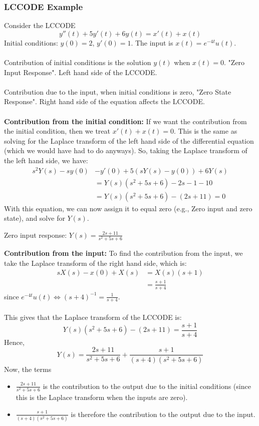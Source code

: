 \documentclass[10pt]{article}
\newcommand{\llra}{\Longleftrightarrow}
\begin{document}
\subsubsection*{LCCODE Example}
Consider the LCCODE
\[y''(t) + 5y'(t) + 6y(t) = x'(t) + x(t)\]
Initial conditions: $y(0) = 2$, $y'(0) = 1$.  The input is $x(t) = e^{-4t} u(t)$.\\\\
Contribution of initial conditions is the solution $y(t)$ when $x(t) = 0$.  "Zero Input Response".  Left hand side of the LCCODE.\\\\
Contribution due to the input, when initial conditions is zero, "Zero State Response".  Right hand side of the equation affects the LCCODE.\\\\
\textbf{Contribution from the initial condition:} If we want the contribution from the initial condition, then we treat $x'(t) + x(t) = 0$.  This is the same as solving for the Laplace transform of the left hand side of the differential equation (which we would have had to do anyways).  So, taking the Laplace transform of the left hand side, we have:
\begin{align*}
    s^2 Y(s) - sy(0) &- y'(0) + 5(sY(s) - y(0)) + 6Y(s)\\
    &= Y(s)(s^2 + 5s + 6) - 2s - 1 - 10\\
    &= Y(s)(s^2 + 5s + 6) - (2s + 11) = 0
\end{align*}
With this equation, we can now assign it to equal zero (e.g., Zero input and zero state), and solve for $Y(s)$.
\begin{center}
Zero input response: $Y(s) = \frac{2s + 11}{s^2 + 5s + 6}$
\end{center}
\textbf{Contribution from the input:} To find the contribution from the input, we take the Laplace transform of the right hand side, which is:
\begin{align*}
    sX(s) - x(0) + X(s) &= X(s)(s + 1)\\
    &= \frac{s + 1}{s + 4}
\end{align*}
since $e^{-4t} u(t) \llra (s + 4)^{-1} = \frac{1}{s + 4}$.\\\\
This gives that the Laplace transform of the LCCODE is:
\[Y(s)(s^2 + 5s + 6) - (2s + 11) = \frac{s + 1}{s + 4}\]
Hence,
\[Y(s) = \frac{2s + 11}{s^2 + 5s + 6} + \frac{s + 1}{(s + 4)(s^2 + 5s + 6)}\]
Now, the terms
\begin{itemize}
    \item $\frac{2s + 11}{s^2 + 5s + 6}$ is the contribution to the output due to the initial conditions (since this is the Laplace transform when the inputs are zero).
    \item $\frac{s + 1}{(s + 4)(s^2 + 5s + 6)}$ is therefore the contribution to the output due to the input.
\end{itemize}
\end{document}
